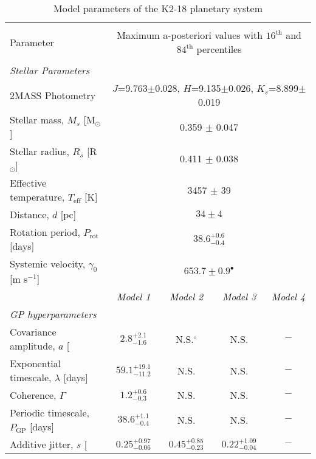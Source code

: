 \clearpage
\begin{landscape}
\begin{table*}
\footnotesize
\centering
\renewcommand{\arraystretch}{0.6}
\caption[]{Model parameters of the K2-18 planetary system}
\label{k218table:k2184}
\begin{tabular}{lcccc}
\hline \\ [-1ex]
Parameter & \multicolumn{4}{c}{Maximum a-posteriori values with $16^{\text{th}}$ and $84^{\text{th}}$ percentiles} \\
\hline \\ [-1ex]
\emph{Stellar Parameters} & & & & \\
2MASS Photometry & \multicolumn{4}{c}{$J$=9.763$\pm$0.028, $H$=9.135$\pm$0.026, $K_s$=8.899$\pm$0.019} \\
Stellar mass, $M_s$ [M$_{\odot}$]  &  \multicolumn{4}{c}{0.359 $\pm$ 0.047}   \\
Stellar radius, $R_s$ [R$_{\odot}$]   &  \multicolumn{4}{c}{0.411 $\pm$ 0.038}   \\
Effective temperature, $T_{\text{eff}}$ [K]  & \multicolumn{4}{c}{3457 $\pm$ 39} \\
Distance, $d$ [pc] & \multicolumn{4}{c}{$34 \pm 4$} \\
Rotation period, $P_{\text{rot}}$ [days] & \multicolumn{4}{c}{$38.6^{+0.6}_{-0.4}$} \\
Systemic velocity, $\gamma_0$ [m s$^{-1}$] & \multicolumn{4}{c}{$653.7 \pm 0.9^{\bullet}$} \medskip \\

& \emph{Model 1} & \emph{Model 2} & \emph{Model 3} & \emph{Model 4} \\
\emph{GP hyperparameters} & & & & \\
Covariance amplitude, $a$ [\mps{]} & $2.8^{+2.1}_{-1.6}$ & N.S.$^{\circ}$ & N.S. & $-$ \\
Exponential timescale, $\lambda$ [days] &  $59.1^{+19.1}_{-11.2}$ & N.S. & N.S. & $-$\\
Coherence, $\Gamma$ & $1.2^{+0.6}_{-0.3}$ & N.S. & N.S. & $-$ \\
Periodic timescale, $P_{\text{GP}}$ [days] & $38.6^{+1.1}_{-0.4}$ & N.S. & N.S. & $-$ \\
Additive jitter, $s$ [\mps{]} & $0.25^{+0.97}_{-0.06}$ & $0.45^{+0.85}_{-0.23}$ & $0.22^{+1.09}_{-0.04}$ & $-$ \medskip \\


\end{tabular}
\end{table*}
\end{landscape}
